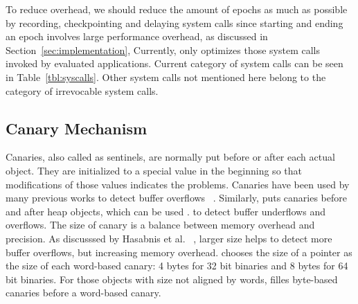 To reduce overhead, we should reduce the amount of epochs as much as possible by 
recording, checkpointing and delaying system calls since starting and ending an epoch 
involves large performance overhead, as discussed in Section~\ref{sec:implementation}, 
Currently, \doubletake{} only optimizes those system calls invoked by evaluated applications.
Current category of system calls can be seen in Table~\ref{tbl:syscalls}. Other system calls
not mentioned here belong to the category of irrevocable system calls. 

\begin{comment}
To support multithreading programs, \DoubleTake{} has to record the order of synchronizations 
and replay them in the same order (Section~\ref{sec:multithreading}) and design memory allocator specially (Section~\ref{sec:mtheap}).

The basic idea of \DoubleTake{} is to greatly {\em reduce the number of checkings}:  
instead of checking a possible out-of-bounds error before every memory access, 
\DoubleTake{} checks all possible out-of-bounds errors of the whole program 
before those irrevocable system calls or in the end of an execution.
By checking buffer overflows accumulatively, \DoubleTake{} amortizes 
checking overhead over long executions and achieves much better performance. 
As showed in Figure~\ref{fig:diagram}, if a program does not have buffer overflows, 
it continues to perform those system calls and 
starts a new epoch after them by snapshotting state of this execution. 
If a program is found to have buffer overflows, \DoubleTake{} re-executes it by rolling back 
to last good state after installing hardware watchpoints on those overflowing addresses.
By handling exceptions, 
\DoubleTake{} can pinpoint precisely those memory accesses causing memory overflows without
actually instrumenting every access. 
\end{comment}


\subsection{Canary Mechanism}
\label{sec:canaries}
Canaries, also called as sentinels, are normally put before or after each actual object.
They are initialized to a special value in the beginning so that modifications of those values
indicates the problems.
Canaries have been used by many previous works to
detect buffer overflows ~\cite{overflow:purify, exterminator, overflow:lbc}.
Similarly, \stopgap{} puts canaries before and after heap objects, which can be used .
to detect buffer underflows and overflows.
The size of canary is a balance between memory overhead and precision.
As discusssed by Hasabnis et al. ~\cite{overflow:lbc}, larger size helps to detect more
buffer overflows, but increasing memory overhead.
\stopgap{} chooses the size of a pointer as the size of each word-based canary:
4 bytes for 32 bit binaries and 8 bytes for 64 bit binaries.
For those objects with size not aligned by words, \stopgap{} filles byte-based canaries before a
word-based canary.

